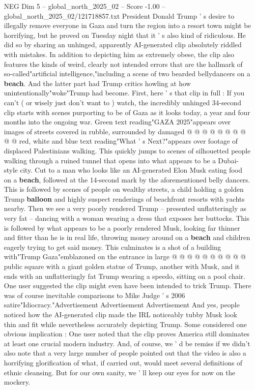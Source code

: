 \begin{textsample}{NEG Dim 5 – global\_north\_2025\_02 – Score -1.00 – global\_north\_2025\_02/121718857.txt}  \label{ex:f5_neg_128}
President Donald Trump ' s desire to illegally remove everyone in Gaza and turn the region into a resort town might be horrifying, but he proved on Tuesday night that it ' s also kind of ridiculous.
He did so by sharing an unhinged, apparently AI-generated clip absolutely riddled with mistakes.
In addition to depicting him as extremely obese, the clip also features the kinds of weird, clearly not intended errors that are the hallmark of so-called"artificial intelligence,"including a scene of two bearded bellydancers on a \textbf{beach}.
And the latter part had Trump critics howling at how unintentionally"woke"Trump had become.
First, here ' s that clip in full : If you can't ( or wisely just don't want to ) watch, the incredibly unhinged 34-second clip starts with scenes purporting to be of Gaza as it looks today, a year and four months into the ongoing war.
Green text reading"GAZA 2025"appears over images of streets covered in rubble, surrounded by damaged @ @ @ @ @ @ @ @ @ @ red, white and blue text reading"What ' s Next?"appears over footage of displaced Palestinians walking.
This quickly jumps to scenes of silhouetted people walking through a ruined tunnel that opens into what appears to be a Dubai-style city.
Cut to a man who looks like an AI-generated Elon Musk eating food on a \textbf{beach}, followed at the 14-second mark by the aforementioned belly dancers.
This is followed by scenes of people on wealthy streets, a child holding a golden Trump \textbf{balloon} and highly suspect renderings of beachfront resorts with yachts nearby.
Then we see a very poorly rendered Trump -- presented unflatteringly as very fat -- dancing with a woman wearing a dress that exposes her buttocks.
This is followed by what appears to be a poorly rendered Musk, looking far thinner and fitter than he is in real life, throwing money around on a \textbf{beach} and children eagerly trying to get said money.
This culminates is a shot of a building with"Trump Gaza"emblazoned on the entrance in large @ @ @ @ @ @ @ @ @ @ public square with a giant golden statue of Trump, another with Musk, and it ends with an unflatteringly fat Trump wearing a speedo, sitting on a pool chair.
One user suggested the clip might even have been intended to trick Trump.
There was of course inevitable comparisons to Mike Judge ' s 2006 satire"Idiocracy."Advertisement Advertisement Advertisement And yes, people noticed how the AI-generated clip made the IRL noticeably tubby Musk look thin and fit while nevertheless accurately depicting Trump.
Some considered one obvious implication : One user noted that the clip proves America still dominates at least one crucial modern industry.
And, of course, we ' d be remiss if we didn't also note that a very large number of people pointed out that the video is also a horrifying glorification of what, if carried out, would meet several definitions of ethnic cleansing.
But for our own sanity, we ' ll keep our eyes for now on the mockery.

\end{textsample}
